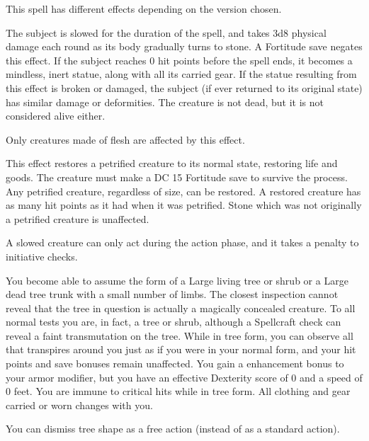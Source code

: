 \spellrng{\rngmed}
\begin{spelleffect}
  This spell has different effects depending on the version chosen.
  \par {} The subject is slowed for the duration of the spell, and takes 3d8 physical damage each round as its body gradually turns to stone. A Fortitude save negates this effect. If the subject reaches 0 hit points before the spell ends, it becomes a mindless, inert statue, along with all its carried gear. If the statue resulting from this effect is broken or damaged, the subject (if ever returned to its original state) has similar damage or deformities. The creature is not dead, but it is not considered alive either.
  \par Only creatures made of flesh are affected by this effect.
  \par {} This effect restores a petrified creature to its normal state, restoring life and goods. The creature must make a DC 15 Fortitude save to survive the process. Any petrified creature, regardless of size, can be restored. A restored creature has as many hit points as it had when it was petrified. Stone which was not originally a petrified creature is unaffected.
\end{spelleffect}
\begin{spellnotes}
 A slowed creature can only act during the action phase, and it takes a  penalty to initiative checks.
\end{spellnotes}

\begin{spelleffect}
  You become able to assume the form of a Large living tree or shrub or a Large dead tree trunk with a small number of limbs. The closest inspection cannot reveal that the tree in question is actually a magically concealed creature. To all normal tests you are, in fact, a tree or shrub, although a Spellcraft check can reveal a faint transmutation on the tree. While in tree form, you can observe all that transpires around you just as if you were in your normal form, and your hit points and save bonuses remain unaffected. You gain a  enhancement bonus to your armor modifier, but you have an effective Dexterity score of 0 and a speed of 0 feet. You are immune to critical hits while in tree form. All clothing and gear carried or worn changes with you.
\end{spelleffect}
\begin{spellnotes}
  You can dismiss tree shape as a free action (instead of as a standard action).
\end{spellnotes}

